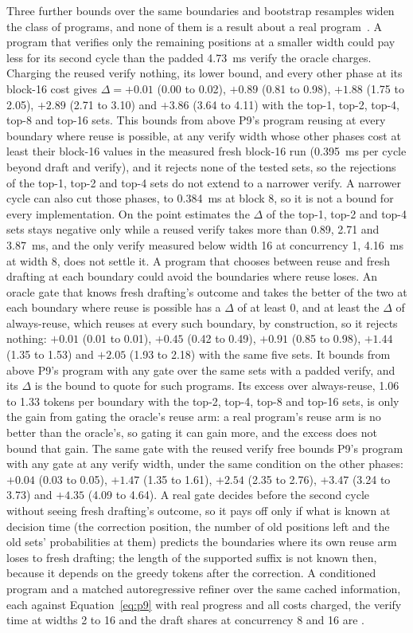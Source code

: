 Three further bounds over the same boundaries and bootstrap resamples widen the class of programs, and none of them is a result about a real program~. A program that verifies only the remaining positions at a smaller width could pay less for its second cycle than the padded 4.73~ms verify the oracle charges. Charging the reused verify nothing, its lower bound, and every other phase at its block-16 cost gives $\Delta=+0.01$ (0.00 to 0.02), $+0.89$ (0.81 to 0.98), $+1.88$ (1.75 to 2.05), $+2.89$ (2.71 to 3.10) and $+3.86$ (3.64 to 4.11) with the top-1, top-2, top-4, top-8 and top-16 sets. This bounds from above P9's program reusing at every boundary where reuse is possible, at any verify width whose other phases cost at least their block-16 values in the measured fresh block-16 run (0.395~ms per cycle beyond draft and verify), and it rejects none of the tested sets, so the rejections of the top-1, top-2 and top-4 sets do not extend to a narrower verify. A narrower cycle can also cut those phases, to 0.384~ms at block 8, so it is not a bound for every implementation. On the point estimates the $\Delta$ of the top-1, top-2 and top-4 sets stays negative only while a reused verify takes more than 0.89, 2.71 and 3.87~ms, and the only verify measured below width 16 at concurrency 1, 4.16~ms at width 8, does not settle it. A program that chooses between reuse and fresh drafting at each boundary could avoid the boundaries where reuse loses. An oracle gate that knows fresh drafting's outcome and takes the better of the two at each boundary where reuse is possible has a $\Delta$ of at least 0, and at least the $\Delta$ of always-reuse, which reuses at every such boundary, by construction, so it rejects nothing: $+0.01$ (0.01 to 0.01), $+0.45$ (0.42 to 0.49), $+0.91$ (0.85 to 0.98), $+1.44$ (1.35 to 1.53) and $+2.05$ (1.93 to 2.18) with the same five sets. It bounds from above P9's program with any gate over the same sets with a padded verify, and its $\Delta$ is the bound to quote for such programs. Its excess over always-reuse, 1.06 to 1.33 tokens per boundary with the top-2, top-4, top-8 and top-16 sets, is only the gain from gating the oracle's reuse arm: a real program's reuse arm is no better than the oracle's, so gating it can gain more, and the excess does not bound that gain. The same gate with the reused verify free bounds P9's program with any gate at any verify width, under the same condition on the other phases: $+0.04$ (0.03 to 0.05), $+1.47$ (1.35 to 1.61), $+2.54$ (2.35 to 2.76), $+3.47$ (3.24 to 3.73) and $+4.35$ (4.09 to 4.64). A real gate decides before the second cycle without seeing fresh drafting's outcome, so it pays off only if what is known at decision time (the correction position, the number of old positions left and the old sets' probabilities at them) predicts the boundaries where its own reuse arm loses to fresh drafting; the length of the supported suffix is not known then, because it depends on the greedy tokens after the correction. A conditioned program and a matched autoregressive refiner over the same cached information, each against Equation~\eqref{eq:p9} with real progress and all costs charged, the verify time at widths 2 to 16 and the draft shares at concurrency 8 and 16 are .

